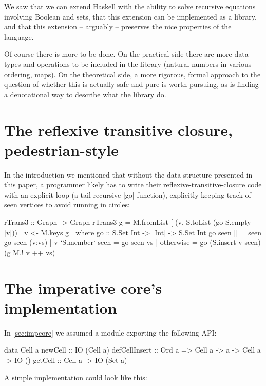 \documentclass[manuscript,review,screen,acmsmall]{acmart}
\begin{document}
We saw that we can extend Haskell with the ability to solve recursive equations involving Boolean and sets, that this extension can be implemented as a library, and that this extension -- arguably -- preserves the nice properties of the language.

Of course there is more to be done. On the practical side there are more data types and operations to be included in the library (natural numbers in various ordering, maps). On the theoretical side, a more rigorous, formal approach to the question of whether this is actually safe and pure is worth pursuing, as is finding a denotational way to describe what the library do.




\clearpage

\appendix
\section{The reflexive transitive closure, pedestrian-style}\label{sec:imp}

In the introduction we mentioned that without the data structure presented in this paper, a programmer likely has to write their reflexive-transitive-closure code with an explicit loop (a tail-recursive |go| function), explicitly keeping track of seen vertices to avoid running in circles:
\begin{code}
rTrans3 :: Graph -> Graph
rTrans3 g = M.fromList [ (v, S.toList (go S.empty [v])) | v <- M.keys g ]
  where
    go :: S.Set Int -> [Int] -> S.Set Int
    go seen [] = seen
    go seen (v:vs)  |  v `S.member` seen  =  go seen vs
                    |  otherwise          =  go (S.insert v seen) (g M.! v ++ vs)
\end{code}

\section{The imperative core's implementation}\label{sec:impcoreimpl}

In \cref{sec:impcore} we assumed a module exporting the following API:
\begin{code}
data Cell a
newCell        ::                                      IO (Cell a)
defCellInsert  ::  Ord a =>  Cell a -> a -> Cell a ->  IO ()
getCell        ::            Cell a ->                 IO (Set a)
\end{code}

\noindent 
A simple implementation could look like this:

\end{document}
